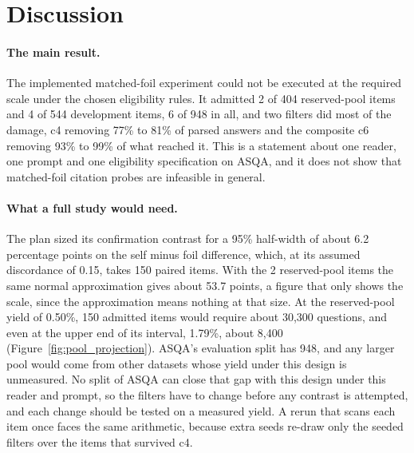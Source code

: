 \documentclass[11pt]{article}
\begin{document}
\section{Discussion}\label{discussion}

\paragraph{The main result.} The implemented matched-foil experiment could not be executed at the required scale under the chosen eligibility rules. It admitted 2 of 404 reserved-pool items and 4 of 544 development items, 6 of 948 in all, and two filters did most of the damage, c4 removing 77\% to 81\% of parsed answers and the composite c6 removing 93\% to 99\% of what reached it. This is a statement about one reader, one prompt and one eligibility specification on ASQA, and it does not show that matched-foil citation probes are infeasible in general.

\paragraph{What a full study would need.} The plan sized its confirmation contrast for a 95\% half-width of about 6.2 percentage points on the self minus foil difference, which, at its assumed discordance of 0.15, takes 150 paired items. With the 2 reserved-pool items the same normal approximation gives about 53.7 points, a figure that only shows the scale, since the approximation means nothing at that size. At the reserved-pool yield of 0.50\%, 150 admitted items would require about 30,300 questions, and even at the upper end of its interval, 1.79\%, about 8,400 (Figure~\ref{fig:pool_projection}). ASQA's evaluation split has 948, and any larger pool would come from other datasets whose yield under this design is unmeasured. No split of ASQA can close that gap with this design under this reader and prompt, so the filters have to change before any contrast is attempted, and each change should be tested on a measured yield. A rerun that scans each item once faces the same arithmetic, because extra seeds re-draw only the seeded filters over the items that survived c4.
\end{document}
